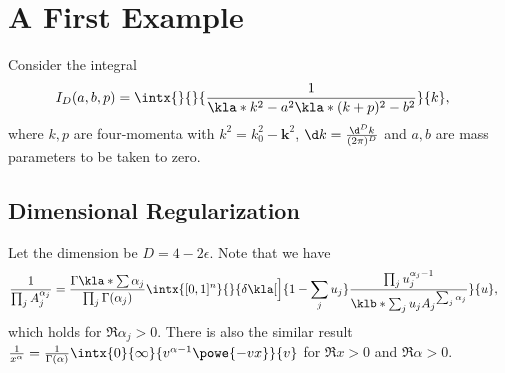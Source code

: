 \documentclass[english, parskip=full]{scrartcl}
\title{\Title}
\author{\Author}
\date{\today}
\begin{document}
\maketitle  %

\section{A First Example}
Consider the integral
\begin{align}
I_D(a,b,p) &= \intx{ }{ }{\frac{1}{\kla*{k^2-a^2} \kla*{(k+p)^2 - b^2}}}{k},
\end{align}
where $k,p$ are four-momenta with $k^2=k_0^2-\textbf{k}^2$, $\d k = \frac{\d^D k}{(2\pi)^D}$ and $a,b$ are mass parameters to be taken to zero.
\subsection{Dimensional Regularization}
Let the dimension be $D=4-2\epsilon$.
Note that we have
\begin{align}
\frac{1}{\prod_j A_j^{\alpha_j}} &= \frac{\Gamma\kla*{\sum \alpha_j}}{\prod_j \Gamma(\alpha_j)} \intx{[0,1]^n}{ }{\delta\kla[\Big]{1 - \sum_j u_j} \frac{\prod_j u_j^{\alpha_j-1}}{\klb*{\sum_j u_j A_j}^{\sum_j \alpha_j}}}{u},
\end{align}
which holds for $\Re\alpha_j > 0$.
There is also the similar result $\frac{1}{x^\alpha} = \frac{1}{\Gamma(\alpha)} \intx{0}{\infty}{ v^{\alpha-1} \powe{-vx} }{v}$ for $\Re x>0$ and $\Re \alpha > 0$.
\end{document}
